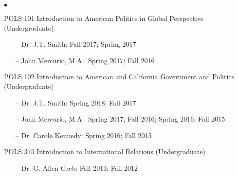 \documentclass[letterpaper,12pt]{article}
\newenvironment{list2}{
  \begin{list}{$\bullet$}{%
      \setlength{\itemsep}{0in}
      \setlength{\parsep}{0in} 
      \setlength{\parskip}{0in}
      \setlength{\topsep}{0in} 
      \setlength{\partopsep}{0in}
      \setlength{\leftmargin}{1in}
      \setlength{\labelsep}{1em}
      \setlength{\labelwidth}{1em}
      \setlength{\itemindent}{-2em}
      \setlength{\listparindent}{2em}}}{\end{list}}
\begin{document}
\begin{list2}
    \item POLS 101 Introduction to American Politics in Global Perspective (Undergraduate)
        \begin{enumerate}[leftmargin=!,labelindent=0pt,itemindent=-15pt]
            \item[--] Dr. J.T. Smith: Fall 2017; Spring 2017
            \item[--] John Mercurio, M.A.: Spring 2017; Fall 2016
        \end{enumerate}
    \item POLS 102 Introduction to American and California Government and Politics (Undergraduate)
        \begin{enumerate}[leftmargin=!,labelindent=0pt,itemindent=-15pt]
            \item[--] Dr. J.T. Smith: Spring 2018; Fall 2017
            \item[--] John Mercurio, M.A.: Spring 2017; Fall 2016; Spring 2016; Fall 2015
            \item[--] Dr. Carole Kennedy: Spring 2016; Fall 2015
        \end{enumerate}
    \item POLS 375 Introduction to International Relations (Undergraduate)
        \begin{enumerate}[leftmargin=!,labelindent=0pt,itemindent=-15pt]
            \item[--] Dr. G. Allen Greb: Fall 2013; Fall 2012
        \end{enumerate}
\end{list2}

\end{document}

